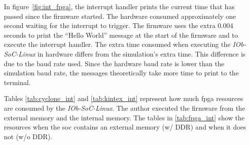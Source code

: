 In figure~\ref{fig:int_fpga}, the interrupt handler prints the current time that has passed since the firmware started. The hardware consumed approximately one second waiting for the interrupt to trigger. The firmware uses the extra 0.004 seconds to print the \enquote{Hello World} message at the start of the firmware and to execute the interrupt handler. The extra time consumed when executing the \textit{IOb-SoC-Linux} in hardware differs from the simulation's extra time. This difference is due to the baud rate used. Since the hardware baud rate is lower than the simulation baud rate, the messages theoretically take more time to print to the terminal.

Tables \ref{tab:cyclone_int} and \ref{tab:kintex_int} represent how much \acrshort{fpga} resources are consumed by the \textit{IOb-SoC-Linux}. The author executed the firmware from the external memory and the internal memory. The tables in \ref{tab:fpga_int} show the resources when the \acrshort{soc} contains an external memory (w/ DDR) and when it does not (w/o DDR).

